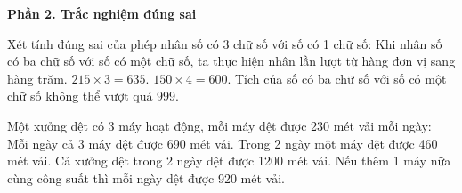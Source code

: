 \textbf{Phần 2. Trắc nghiệm đúng sai}

\begin{ex} %
Xét tính đúng sai của phép nhân số có 3 chữ số với số có 1 chữ số:
\choiceTF
{\True Khi nhân số có ba chữ số với số có một chữ số, ta thực hiện nhân lần lượt từ hàng đơn vị sang hàng trăm.}
{$215 \times 3 = 635$.}
{\True $150 \times 4 = 600$.}
{Tích của số có ba chữ số với số có một chữ số không thể vượt quá 999.}
\end{ex}

\begin{ex} %
Một xưởng dệt có 3 máy hoạt động, mỗi máy dệt được 230 mét vải mỗi ngày:
\choiceTF
{\True Mỗi ngày cả 3 máy dệt được 690 mét vải.}
{\True Trong 2 ngày một máy dệt được 460 mét vải.}
{Cả xưởng dệt trong 2 ngày dệt được 1200 mét vải.}
{\True Nếu thêm 1 máy nữa cùng công suất thì mỗi ngày dệt được 920 mét vải.}
\end{ex}

